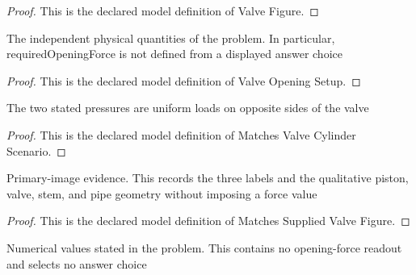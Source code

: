 \begin{proof}
  This is the declared model definition of Valve Figure.
\end{proof}
\begin{definition}
  \label{def:physics:phyx-mini-0661:phyxminiproblems-problemphyxmini0661-valveopeningsetup}
  The independent physical quantities of the problem. In particular, requiredOpeningForce is not defined from a displayed answer choice
\end{definition}
\begin{proof}
  This is the declared model definition of Valve Opening Setup.
\end{proof}
\begin{definition}
  \label{def:physics:phyx-mini-0661:phyxminiproblems-problemphyxmini0661-matchesvalvecylinderscenario}
  The two stated pressures are uniform loads on opposite sides of the valve
\end{definition}
\begin{proof}
  This is the declared model definition of Matches Valve Cylinder Scenario.
\end{proof}
\begin{definition}
  \label{def:physics:phyx-mini-0661:phyxminiproblems-problemphyxmini0661-matchessuppliedvalvefigure}
  Primary-image evidence. This records the three labels and the qualitative piston, valve, stem, and pipe geometry without imposing a force value
\end{definition}
\begin{proof}
  This is the declared model definition of Matches Supplied Valve Figure.
\end{proof}
\begin{definition}
  \label{def:physics:phyx-mini-0661:phyxminiproblems-problemphyxmini0661-matchesproblemreadouts}
  Numerical values stated in the problem. This contains no opening-force readout and selects no answer choice
\end{definition}
